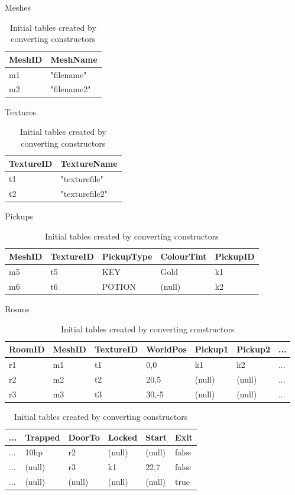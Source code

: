 \begin{table}[h]\footnotesize
Meshes \\
\begin{tabular}{ll}
MeshID & MeshName \\
\hline
m1 & "filename" \\
m2&"filename2" \\
\end{tabular}

Textures \\
\begin{tabular}{ll}
TextureID&TextureName \\
\hline
t1&"texturefile" \\
t2&"texturefile2" \\
\end{tabular}

Pickups \\
\begin{tabular}{lllll}
MeshID&TextureID&PickupType&ColourTint&PickupID \\
\hline
m5&t5&KEY&Gold&k1 \\
m6&t6&POTION&(null)&k2 \\
\end{tabular}

Rooms \\
\begin{tabular}{lllllll}
RoomID&MeshID&TextureID&WorldPos&Pickup1&Pickup2&... \\
\hline
r1&m1&t1&0,0&k1&k2&... \\
r2&m2&t2&20,5&(null)&(null)&... \\
r3&m3&t3&30,-5&(null)&(null)&... \\
\end{tabular}
\begin{tabular}{llllll}
...&Trapped&DoorTo&Locked&Start&Exit \\
\hline
...&10hp&r2&(null)&(null)&false \\
...&(null)&r3&k1&22,7&false \\
...&(null)&(null)&(null)&(null)&true \\
\end{tabular}
\caption{Initial tables created by converting constructors}
\label{tab:initialtables} 
\end{table}

